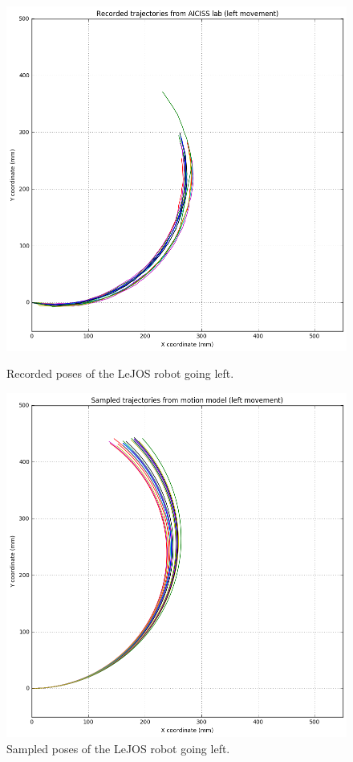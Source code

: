 \documentclass[paper=a4, fontsize=11pt]{scrartcl} %
\begin{document}
	\begin{figure}[H]
		\centering
		\begin{minipage}{0.5\textwidth}
			\centering
			\includegraphics[width=1\textwidth]{images/recorded_poses_left.png} %
			\caption{Recorded poses of the LeJOS robot going left.}
		\end{minipage}\hfill
		\begin{minipage}{0.5\textwidth}
			\centering
			\includegraphics[width=1\textwidth]{images/sampled_poses_left.png} %
			\caption{Sampled poses of the LeJOS robot going left.}
		\end{minipage}
	\end{figure}
\end{document}

